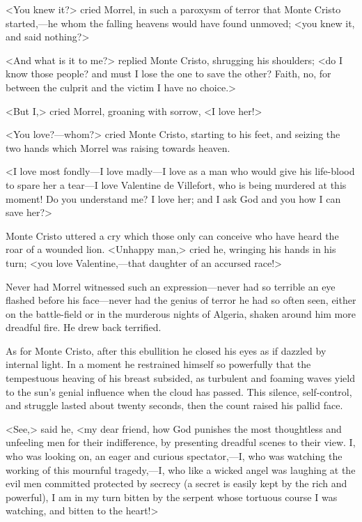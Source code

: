  <You knew it?> cried Morrel, in such a paroxysm of terror that Monte Cristo started,—he whom the falling heavens would have found unmoved; <you knew it, and said nothing?> 

 <And what is it to me?> replied Monte Cristo, shrugging his shoulders; <do I know those people? and must I lose the one to save the other? Faith, no, for between the culprit and the victim I have no choice.> 

 <But I,> cried Morrel, groaning with sorrow, <I love her!> 

 <You love?—whom?> cried Monte Cristo, starting to his feet, and seizing the two hands which Morrel was raising towards heaven. 

 <I love most fondly—I love madly—I love as a man who would give his life-blood to spare her a tear—I love Valentine de Villefort, who is being murdered at this moment! Do you understand me? I love her; and I ask God and you how I can save her?> 

 Monte Cristo uttered a cry which those only can conceive who have heard the roar of a wounded lion. <Unhappy man,> cried he, wringing his hands in his turn; <you love Valentine,—that daughter of an accursed race!> 

 Never had Morrel witnessed such an expression—never had so terrible an eye flashed before his face—never had the genius of terror he had so often seen, either on the battle-field or in the murderous nights of Algeria, shaken around him more dreadful fire. He drew back terrified. 

 As for Monte Cristo, after this ebullition he closed his eyes as if dazzled by internal light. In a moment he restrained himself so powerfully that the tempestuous heaving of his breast subsided, as turbulent and foaming waves yield to the sun's genial influence when the cloud has passed. This silence, self-control, and struggle lasted about twenty seconds, then the count raised his pallid face. 

 <See,> said he, <my dear friend, how God punishes the most thoughtless and unfeeling men for their indifference, by presenting dreadful scenes to their view. I, who was looking on, an eager and curious spectator,—I, who was watching the working of this mournful tragedy,—I, who like a wicked angel was laughing at the evil men committed protected by secrecy (a secret is easily kept by the rich and powerful), I am in my turn bitten by the serpent whose tortuous course I was watching, and bitten to the heart!> 

